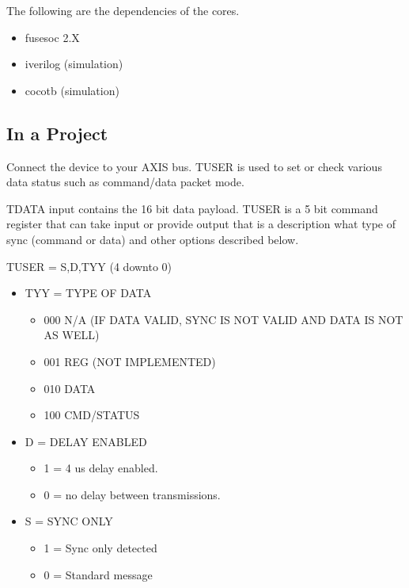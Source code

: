 \par
The following are the dependencies of the cores.

\begin{itemize}
  \item fusesoc 2.X
  \item iverilog (simulation)
  \item cocotb (simulation)
\end{itemize}



\subsection{In a Project}
\par
Connect the device to your AXIS bus. TUSER is used to set or check various data status such as command/data packet mode.

\par
TDATA input contains the 16 bit data payload. TUSER is a 5 bit command register
that can take input or provide output that is a description what type of sync (command or data) 
and other options described below.

TUSER = {S,D,TYY} (4 downto 0)
\begin{itemize}
\item TYY = TYPE OF DATA
  \begin{itemize}
    \item 000 N/A (IF DATA VALID, SYNC IS NOT VALID AND DATA IS NOT AS WELL)
    \item 001 REG (NOT IMPLEMENTED)
    \item 010 DATA
    \item 100 CMD/STATUS
  \end{itemize}
  \item D = DELAY ENABLED
  \begin{itemize}
    \item 1 = 4 us delay enabled.
    \item 0 = no delay between transmissions.
  \end{itemize}
  \item S = SYNC ONLY
  \begin{itemize}
    \item 1 = Sync only detected
    \item 0 = Standard message
  \end{itemize}
\end{itemize}

